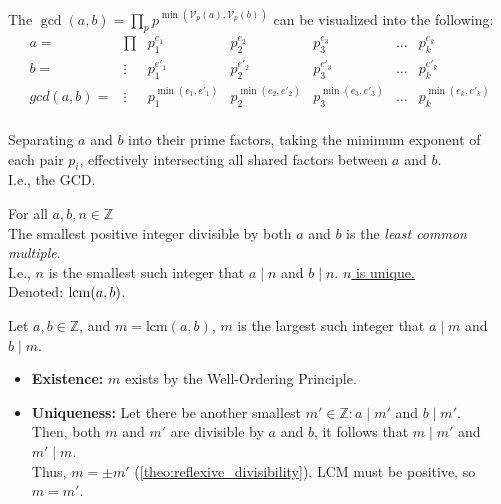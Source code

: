 \begin{Proof}

    \label{proof:gcd_abstracted}

    The $\gcd(a,b) = \prod_{p} p^{\min(\mathcal{V}_p(a),\mathcal{V}_p(b))}$ can be visualized into the following:
    \[
    \begin{array}{ccc|c|c|c|c}
    
    a=&\prod&p_1^{e_1} & p_2^{e_2} & p_3^{e_3} & \dots & p_k^{e_k} \\
    b=&\vdots&p_1^{e'_1} & p_2^{e'_2} & p_3^{e'_3} & \dots & p_k^{e'_k} \\
    \hline
    gcd(a,b)=&\vdots&p_1^{\min(e_1, e'_1)} & p_2^{\min(e_2, e'_2)} & p_3^{\min(e_3, e'_3)} & \dots & p_k^{\min(e_k, e'_k)} \\

    \end{array}
    \]

    \noindent
    Separating $a$ and $b$ into their prime factors, taking the minimum exponent of each pair $p_i$,
    effectively intersecting all shared factors between $a$ and $b$.\\
    
    \noindent
    I.e., the GCD.

\end{Proof}

\begin{Def}

    For all $a,b,n\in\mathbb{Z}$\\
    The smallest positive integer divisible by both $a$ and $b$ is the \textit{least common multiple}.\\
    I.e., $n$ is the smallest such integer that $a\mid n$ and $b\mid n$. \underline{$n$ is unique.}\\

    \noindent
    Denoted: $\operatorname{lcm}(a,b)$.
\end{Def}


\begin{Proof}

    \label{proof:lcm_existence_uniqueness}

    Let $a,b\in\mathbb{Z}$, and $m=\text{lcm}(a,b)$, $m$ is the largest such integer that $a\mid m$ and $b\mid m$.
    \begin{itemize}
        \item  \textbf{Existence:} $m$ exists by the Well-Ordering Principle.
        \item \textbf{Uniqueness:} Let there be another smallest $m'\in\mathbb{Z}:a\mid m'$ and $b\mid m'$.\\
        Then, both $m$ and $m'$ are divisible by $a$ and $b$, it follows that $m \mid m'$ and $m' \mid m$.\\
        Thus, $m=\pm m'$ (\ref{theo:reflexive_divisibility}). LCM must be positive, so $m = m'$.
    \end{itemize}
\end{Proof}

